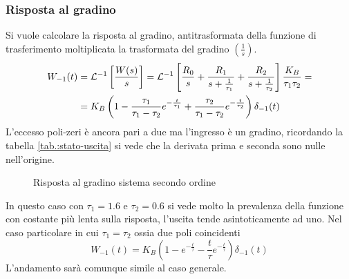 \subsubsection{Risposta al gradino}
Si vuole calcolare la risposta al gradino, antitrasformata della funzione di
trasferimento moltiplicata la trasformata del gradino
$\left(\frac{1}{s}\right)$.
$$\begin{aligned}
W_{-1}(t) &= \mathcal{L}^{-1}\left[ \frac{W(s)}{s} \right] =
\mathcal{L}^{-1}\left[\frac{R_0}{s} + \frac{R_1}{s+\frac{1}{\tau_1}} + \frac{R_2}
{s+\frac{1}{\tau_2}}
\right]\frac{K_B}{\tau_1\tau_2} = \\
&=K_B\left( 1 -
\frac{\tau_1}{\tau_1-\tau_2}e^{-\frac{t}{\tau_1}} +
\frac{\tau_2}{\tau_1-\tau_2}e^{-\frac{t}{\tau_2}}\right)\delta_{-1}(t)
\end{aligned}$$
L'eccesso poli-zeri è ancora pari a due ma l'ingresso è un gradino, ricordando
la tabella \ref{tab.:stato-uscita} si vede che la derivata prima e seconda
sono nulle nell'origine.

\def\tOne{1.6}
\def\tTwo{0.6}
\def\dt{(\tOne-\tTwo)}
\begin{figure}[h]
 \centering
 \caption{Risposta al gradino sistema secondo ordine}
 \label{fig.:gradino_secondo_ordine}
\end{figure}
In questo caso con $\tau_1 = \tOne$ e $\tau_2 = \tTwo$ si vede molto la
prevalenza della funzione con costante più
lenta sulla risposta, l'uscita tende asintoticamente ad uno.
Nel caso particolare in cui $\tau_1 = \tau_2$ ossia due poli coincidenti
$$
W_{-1}(t) = K_B \left( 1 - e^{-\frac{t}{\tau}} -
\frac{t}{\tau}e^{-\frac{t}{\tau}}
\right)\delta_{-1}(t)
$$
L'andamento sarà comunque simile al caso generale.

